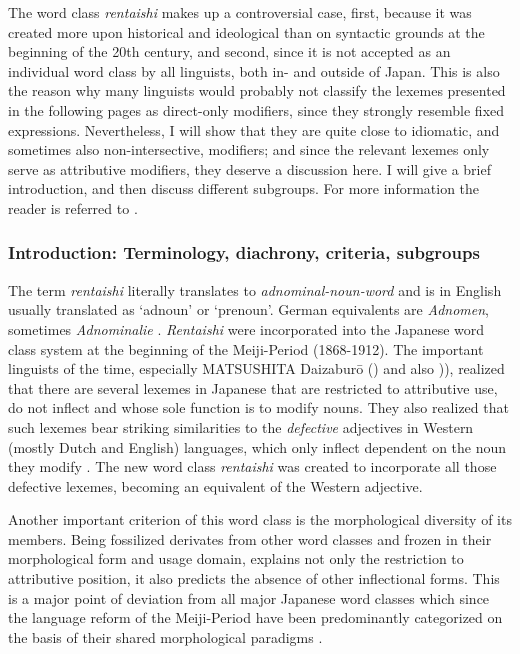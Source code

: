 \documentclass [output=book,colorlinks,citecolor=brown]{langscibook}
\begin{document}
The word class \textit{rentaishi} makes up a controversial case, first, because it was created more upon historical and ideological than on syntactic grounds at the beginning of the 20th century, and second, since it is not accepted as an individual word class by all linguists, both in- and outside of Japan. This is also the reason why many linguists would probably not classify the lexemes presented in the following pages as direct-only modifiers, since they strongly resemble fixed expressions. Nevertheless, I will show that they are quite close to idiomatic, and sometimes also non-intersective, modifiers; and since the relevant lexemes only serve as attributive modifiers, they deserve a discussion here. I will give a brief introduction, and then discuss different subgroups. For more information the reader is referred to \citet{kohlich:2020:rentaishi, kohlich:2023:uninflecting}. %

\subsubsection{Introduction: Terminology, diachrony, criteria, subgroups}

The term \textit{rentaishi} literally translates to \textit{adnominal-noun-word} and is in English usually translated as `adnoun’ or `prenoun’. German equivalents are \textit{Adnomen}, sometimes \textit{Adnominalie} \citep{rickmeyer:1995:japanische}. \textit{Rentaishi} were incorporated into the Japanese word class system at the beginning of the Meiji-Period (1868-1912). The important linguists of the time, especially MATSUSHITA Daizaburō (\citealt{matsushita:1976:kaisen}) and also \citealt{yamada:1908:nihon, mitsuya:1932:bunpo, sekine:1937:fukutaishi, kieda:1938:koto, tokieda:1941:kokugogaku, yuzawa:1979:kokugo})), realized that there are several lexemes in Japanese that are restricted to attributive use, do not inflect and whose sole function is to modify nouns. They also realized that such lexemes bear striking similarities to the \textit{defective} adjectives in Western (mostly Dutch and English) languages, which only inflect dependent on the noun they modify \citep{sugimoto:1967:kindai, sugimoto:1991:kokugo, kim:2006:kindai}. The new word class \textit{rentaishi} was created to incorporate all those defective lexemes, becoming an equivalent of the Western adjective. %

Another important criterion of this word class is the morphological diversity of its members. Being fossilized derivates from other word classes and frozen in their morphological form and usage domain, explains not only the restriction to attributive position, it also predicts the absence of other inflectional forms. This is a major point of deviation from all major Japanese word classes which since the language reform of the Meiji-Period have been predominantly categorized on the basis of their shared morphological paradigms \citep{nitta:2000:bun}. %
\end{document}

